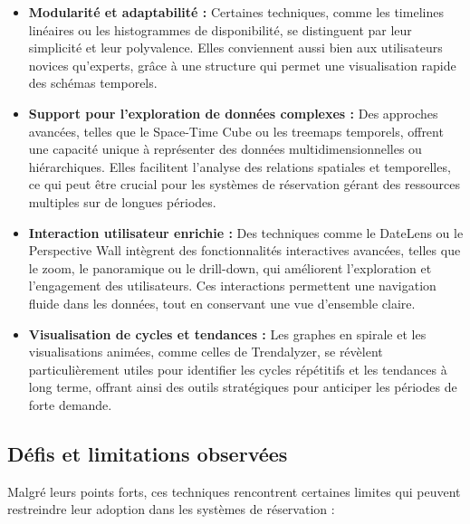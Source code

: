 \documentclass[runningheads]{llncs}
\begin{document}
\begin{itemize}
    \item \textbf{Modularité et adaptabilité :} Certaines techniques, comme les timelines linéaires ou les histogrammes de disponibilité, se distinguent par leur simplicité et leur polyvalence. Elles conviennent aussi bien aux utilisateurs novices qu’experts, grâce à une structure qui permet une visualisation rapide des schémas temporels.
    
    \item \textbf{Support pour l’exploration de données complexes :} Des approches avancées, telles que le Space-Time Cube ou les treemaps temporels, offrent une capacité unique à représenter des données multidimensionnelles ou hiérarchiques. Elles facilitent l’analyse des relations spatiales et temporelles, ce qui peut être crucial pour les systèmes de réservation gérant des ressources multiples sur de longues périodes.
    
    \item \textbf{Interaction utilisateur enrichie :} Des techniques comme le DateLens ou le Perspective Wall intègrent des fonctionnalités interactives avancées, telles que le zoom, le panoramique ou le drill-down, qui améliorent l’exploration et l’engagement des utilisateurs. Ces interactions permettent une navigation fluide dans les données, tout en conservant une vue d’ensemble claire.
    
    \item \textbf{Visualisation de cycles et tendances :} Les graphes en spirale et les visualisations animées, comme celles de Trendalyzer, se révèlent particulièrement utiles pour identifier les cycles répétitifs et les tendances à long terme, offrant ainsi des outils stratégiques pour anticiper les périodes de forte demande.
\end{itemize}

\subsection{Défis et limitations observées}

Malgré leurs points forts, ces techniques rencontrent certaines limites qui peuvent restreindre leur adoption dans les systèmes de réservation :
\end{document}
